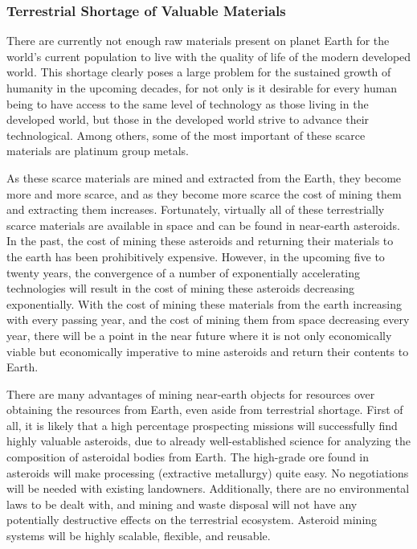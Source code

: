 \documentclass[letter,11pt]{article}
\begin{document}
\subsubsection*{Terrestrial Shortage of Valuable Materials}

There are currently not enough raw materials present on planet Earth
for the world's current population to live with the quality of life
of the modern developed world\cite{gordon}. This shortage clearly
poses a large problem for the sustained growth of humanity in the
upcoming decades, for not only is it desirable for every human being
to have access to the same level of technology as those living in
the developed world, but those in the developed world strive to advance
their technological. Among others, some of the most important of these
scarce materials are platinum group metals\cite{gerlach}.

As these scarce materials are mined and extracted from the Earth,
they become more and more scarce, and as they become more scarce the
cost of mining them and extracting them increases. Fortunately, virtually
all of these terrestrially scarce materials are available in space
and can be found in near-earth asteroids. In the past, the cost of
mining these asteroids and returning their materials to the earth
has been prohibitively expensive. However, in the upcoming five to
twenty years, the convergence of a number of exponentially accelerating
technologies will result in the cost of mining these asteroids decreasing
exponentially. With the cost of mining these materials from the earth
increasing with every passing year, and the cost of mining them from
space decreasing every year, there will be a point in the near future
where it is not only economically viable but economically imperative
to mine asteroids and return their contents to Earth\cite{gerlach}.

There are many advantages of mining near-earth objects for resources
over obtaining the resources from Earth, even aside from terrestrial
shortage. First of all, it is likely that a high percentage prospecting
missions will successfully find highly valuable asteroids, due to already
well-established science for analyzing the composition of asteroidal
bodies from Earth. The high-grade ore found in asteroids will make
processing (extractive metallurgy) quite easy. No negotiations will
be needed with existing landowners. Additionally, there are no environmental
laws to be dealt with, and mining and waste disposal will not have
any potentially destructive effects on the terrestrial ecosystem.
Asteroid mining systems will be highly scalable, flexible, and reusable\cite{sonter}.
\end{document}

